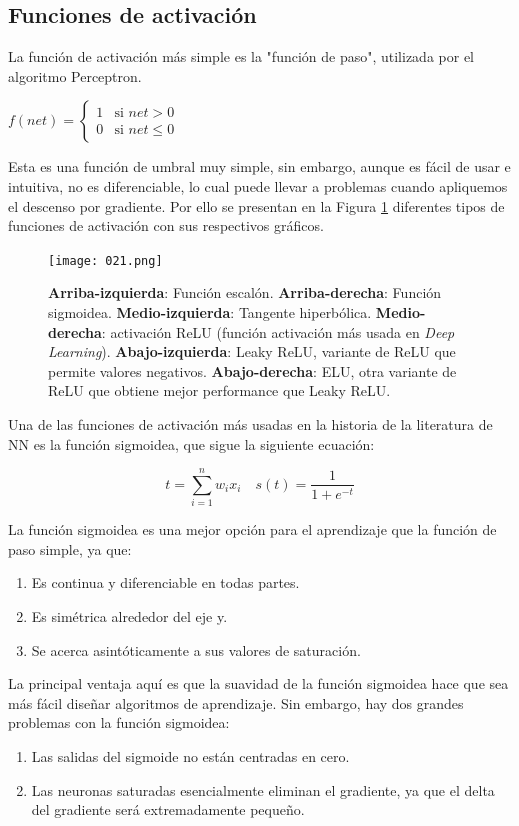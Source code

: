 \documentclass[14.5pt,a4paper]{article}
\begin{document}
\subsection{Funciones de activación}
La función de activación más simple es la "función de paso", utilizada por el algoritmo Perceptron.

$
f(net) =
\left\{
	\begin{array}{ll}
		1  	& \mbox{si } net > 0 \\
		0 	& \mbox{si } net \leq 0
	\end{array}
\right.
$

Esta es una función de umbral muy simple, sin embargo, aunque es fácil de usar e intuitiva, no es diferenciable, lo cual puede llevar a problemas cuando apliquemos el descenso por gradiente.
Por ello se presentan en la Figura \ref{fig:typesfactivation} diferentes tipos de funciones de activación con sus respectivos gráficos.

\begin{figure}[H]
	\begin{center}				
	\texttt{[image: 021.png]}
  	\caption{\textbf{Arriba-izquierda}: Función escalón. \textbf{Arriba-derecha}: Función sigmoidea. \textbf{Medio-izquierda}: Tangente hiperbólica. \textbf{Medio-derecha}: activación ReLU (función activación más usada en \textit{Deep Learning}).
 \textbf{Abajo-izquierda}: Leaky ReLU, variante de ReLU que permite valores negativos. \textbf{Abajo-derecha}:
ELU, otra variante de ReLU que obtiene mejor performance que Leaky ReLU.}
  	\label{fig:typesfactivation}
  	\end{center}
\end{figure}

Una de las funciones de activación más usadas en la historia de la literatura de NN es la función sigmoidea, que sigue la siguiente ecuación:

\begin{equation}
t=\sum_{i=1}^{n}w_ix_i \quad s(t)=\frac{1}{1+e^{-t}}
\end{equation}

La función sigmoidea es una mejor opción para el aprendizaje que la función de paso simple, ya que:
\begin{enumerate}
\item Es continua y diferenciable en todas partes.
\item Es simétrica alrededor del eje y.
\item Se acerca asintóticamente a sus valores de saturación.
\end{enumerate}
La principal ventaja aquí es que la suavidad de la función sigmoidea hace que sea más fácil diseñar algoritmos de aprendizaje. Sin embargo, hay dos grandes problemas con la función sigmoidea:
\begin{enumerate}
\item Las salidas del sigmoide no están centradas en cero.
\item Las neuronas saturadas esencialmente eliminan el gradiente, ya que el delta del gradiente será extremadamente pequeño.
\end{enumerate}
\end{document}
